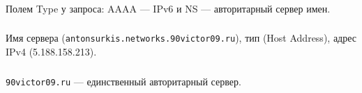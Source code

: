\subsubsection{}
Полем Type у запроса: AAAA --- IPv6 и NS --- авторитарный сервер имен.

\subsubsection{}
Имя сервера (\texttt{antonsurkis.networks.90victor09.ru}), тип (Host Address), адрес IPv4 (5.188.158.213).

\subsubsection{}
\texttt{90victor09.ru} --- единственный авторитарный сервер.